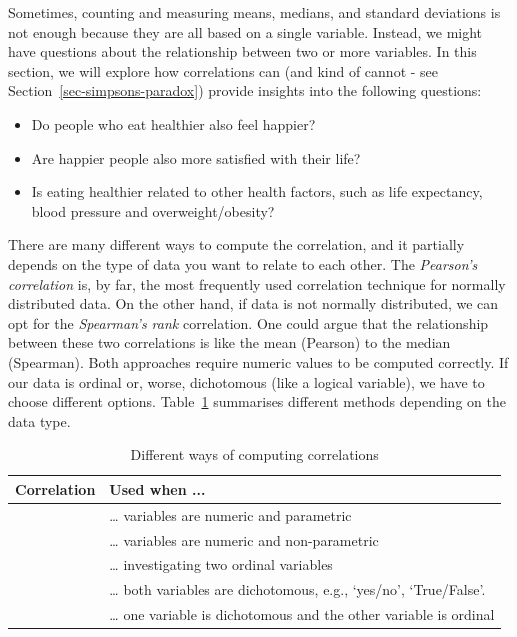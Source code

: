 \documentclass[
  letterpaper,
]{krantz}
\begin{document}
Sometimes, counting and measuring means, medians, and standard
deviations is not enough because they are all based on a single
variable. Instead, we might have questions about the relationship
between two or more variables. In this section, we will explore how
correlations can (and kind of cannot - see
Section~\ref{sec-simpsons-paradox}) provide insights into the following
questions:

\begin{itemize}
\item
  Do people who eat healthier also feel happier?
\item
  Are happier people also more satisfied with their life?
\item
  Is eating healthier related to other health factors, such as life
  expectancy, blood pressure and overweight/obesity?
\end{itemize}

There are many different ways to compute the correlation, and it
partially depends on the type of data you want to relate to each other.
The \emph{Pearson's correlation} is, by far, the most frequently used
correlation technique for normally distributed data. On the other hand,
if data is not normally distributed, we can opt for the \emph{Spearman's
rank} correlation. One could argue that the relationship between these
two correlations is like the mean (Pearson) to the median (Spearman).
Both approaches require numeric values to be computed correctly. If our
data is ordinal or, worse, dichotomous (like a logical variable), we
have to choose different options. Table~\ref{tbl-different-correlations}
summarises different methods depending on the data type.

\begingroup
\fontsize{9.0pt}{10.8pt}\selectfont

\begin{longtable}{>{\raggedright\arraybackslash}p{\dimexpr 67.50pt -2\tabcolsep-1.5\arrayrulewidth}>{\raggedright\arraybackslash}p{\dimexpr 270.00pt -2\tabcolsep-1.5\arrayrulewidth}}

\caption{\label{tbl-different-correlations}Different ways of computing
correlations}

\tabularnewline

\toprule
Correlation & Used when ... \\ 
\midrule\addlinespace[2.5pt]
{\itshape Pearson} & \ldots{} variables are numeric and parametric \\ 
{\itshape Spearman} & \ldots{} variables are numeric and non-parametric \\ 
{\itshape Polychoric} & \ldots{} investigating two ordinal variables \\ 
{\itshape Tetrachoric} & \ldots{} both variables are dichotomous, e.g., `yes/no', `True/False'. \\ 
{\itshape Rank-biserial} & \ldots{} one variable is dichotomous and the other variable is ordinal \\ 
\bottomrule

\end{longtable}
\end{document}
